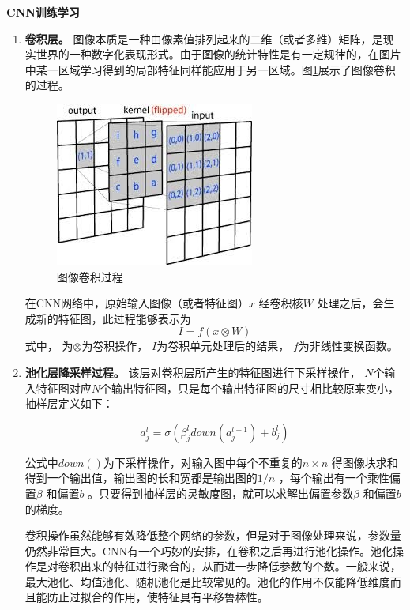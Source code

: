 \textbf{CNN训练学习} 

\begin{enumerate}
\item \textbf{卷积层。} 图像本质是一种由像素值排列起来的二维（或者多维）矩阵，是现实世界的一种数字化表现形式。由于图像的统计特性是有一定规律的，在图片中某一区域学习得到的局部特征同样能应用于另一区域。图\ref{conv}展示了图像卷积的过程。 

\begin{figure}[htbp]
\begin{center}
 \includegraphics[width=0.5\linewidth]{figures/卷积过程}
 \end{center} \vspace{-4mm}
\caption{图像卷积过程} 
\label{conv}
\end{figure}

在CNN网络中，原始输入图像（或者特征图）$x$ 经卷积核$W$ 处理之后，会生成新的特征图，此过程能够表示为
\begin{equation}
 I = f(x \otimes W)
\end{equation}
式中， 为$\otimes $为卷积操作， $I$为卷积单元处理后的结果， $f$为非线性变换函数。

\item \textbf{池化层降采样过程。} 该层对卷积层所产生的特征图进行下采样操作， $N$个输入特征图对应$N$个输出特征图，只是每个输出特征图的尺寸相比较原来变小，抽样层定义如下：

\begin{equation}
  a_j^l  =\sigma (\beta_j^l down(a_j^{l-1}) + b_j^l)
\end{equation}

公式中$down()$为下采样操作，对输入图中每个不重复的$n\times n$ 得图像块求和得到一个输出值，输出图的长和宽都是输出图的$1/n$ ，每个输出有一个乘性偏置$\beta$ 和偏置$b$ 。只要得到抽样层的灵敏度图，就可以求解出偏置参数$\beta$ 和偏置$b$的梯度。

卷积操作虽然能够有效降低整个网络的参数，但是对于图像处理来说，参数量仍然非常巨大。CNN有一个巧妙的安排，在卷积之后再进行池化操作。池化操作是对卷积出来的特征进行聚合的，从而进一步降低参数的个数。一般来说，最大池化、均值池化、随机池化是比较常见的。池化的作用不仅能降低维度而且能防止过拟合的作用，使特征具有平移鲁棒性。


\end{enumerate}
